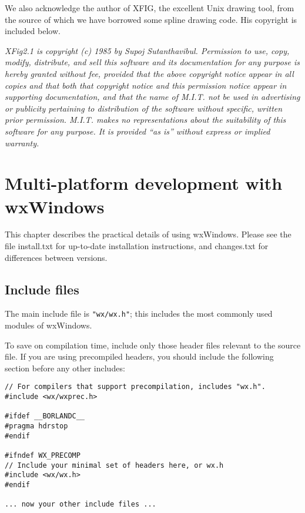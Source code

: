 We also acknowledge the author of XFIG, the excellent Unix drawing tool,
from the source of which we have borrowed some spline drawing code.
His copyright is included below.

{\it XFig2.1 is copyright (c) 1985 by Supoj Sutanthavibul. Permission to
use, copy, modify, distribute, and sell this software and its
documentation for any purpose is hereby granted without fee, provided
that the above copyright notice appear in all copies and that both that
copyright notice and this permission notice appear in supporting
documentation, and that the name of M.I.T. not be used in advertising or
publicity pertaining to distribution of the software without specific,
written prior permission.  M.I.T. makes no representations about the
suitability of this software for any purpose.  It is provided ``as is''
without express or implied warranty.}

\chapter{Multi-platform development with wxWindows}\label{multiplat}
%
\setfooter{\thepage}{}{}{}{}{\thepage}%

This chapter describes the practical details of using wxWindows. Please
see the file install.txt for up-to-date installation instructions, and
changes.txt for differences between versions.

\section{Include files}

The main include file is {\tt "wx/wx.h"}; this includes the most commonly
used modules of wxWindows.

To save on compilation time, include only those header files relevant to the
source file. If you are using precompiled headers, you should include
the following section before any other includes:

\begin{verbatim}
// For compilers that support precompilation, includes "wx.h".
#include <wx/wxprec.h>

#ifdef __BORLANDC__
#pragma hdrstop
#endif

#ifndef WX_PRECOMP
// Include your minimal set of headers here, or wx.h
#include <wx/wx.h>
#endif

... now your other include files ...
\end{verbatim}


